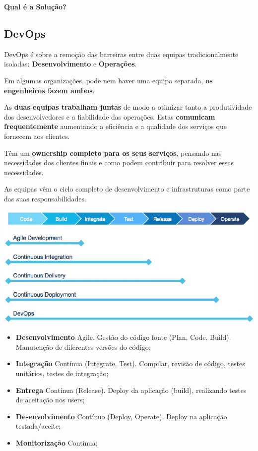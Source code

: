 \documentclass{article}
\begin{document}
\begin{center}
  \textbf{Qual é a Solução?}
\end{center}

\subsection{DevOps}

DevOps é sobre a remoção das barreiras entre duas equipas
tradicionalmente isoladas: \textbf{Desenvolvimento} e \textbf{Operações}.

\vspace{2mm}

Em algumas organizações, pode nem haver uma equipa separada,
\textbf{os engenheiros fazem ambos}.

\vspace{2mm}

As \textbf{duas equipas trabalham juntas} de modo a otimizar
tanto a produtividade dos desenvolvedores e a fiabilidade
das operações.
Estas \textbf{comunicam frequentemente} aumentando a eficiência
e a qualidade dos serviços que fornecem aos clientes.

Têm um \textbf{ownership completo para os seus serviços}, pensando
nas necessidades dos clientes finais e como podem contribuir para
resolver essas necessidades.

\vspace{2mm}

As equipas vêm o ciclo completo de desenvolvimento e infrastruturas
como parte das suas responsabilidades.

\begin{center}
  \includegraphics[scale=0.6]{35}
\end{center}

\pagebreak

\begin{itemize}
  \item \textbf{Desenvolvimento} Agile. Gestão do código fonte
  (Plan, Code, Build). Manutenção de diferentes versões do código;
  \item \textbf{Integração} Contínua (Integrate, Test).
  Compilar, revisão de código, testes unitários, testes de integração;
  \item \textbf{Entrega} Contínua (Release). Deploy da aplicação (build), realizando
  testes de aceitação nos users;
  \item \textbf{Desenvolvimento} Contínuo (Deploy, Operate). Deploy na
  aplicação testada/aceite;
  \item \textbf{Monitorização} Contínua;
\end{itemize}
\end{document}
